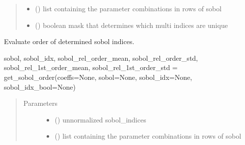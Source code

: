 \documentclass[letterpaper,10pt,english,openany,oneside]{sphinxmanual}
\begin{document}
\begin{fulllineitems}
\begin{fulllineitems}
\begin{quote}
\begin{description}
\begin{itemize}
\item {} 
 () \textendash{} list containing the parameter combinations in rows of sobol

\item {} 
 () \textendash{} boolean mask that determines which multi indices are unique

\end{itemize}


\end{description}\end{quote}

\end{fulllineitems}


\begin{fulllineitems}
\label{\detokenize{pygpc:pygpc.gpc.gPC.get_sobol_order}}
Evaluate order of determined sobol indices.

sobol, sobol\_idx, sobol\_rel\_order\_mean, sobol\_rel\_order\_std, sobol\_rel\_1st\_order\_mean, sobol\_rel\_1st\_order\_std
= get\_sobol\_order(coeffs=None, sobol=None, sobol\_idx=None, sobol\_idx\_bool=None)
\begin{quote}\begin{description}
\item[{Parameters}] \leavevmode\begin{itemize}
\item {} 
 (\sphinxstyleliteralemphasis{\sphinxupquote{{[}}}\sphinxstyleliteralemphasis{\sphinxupquote{{]} }}) \textendash{} unnormalized sobol\_indices

\item {} 
 (\sphinxstyleliteralemphasis{\sphinxupquote{ {[}}}\sphinxstyleliteralemphasis{\sphinxupquote{{]} }}) \textendash{} list containing the parameter combinations in rows of sobol


\end{itemize}
\end{description}
\end{quote}
\end{fulllineitems}
\end{fulllineitems}
\end{document}

